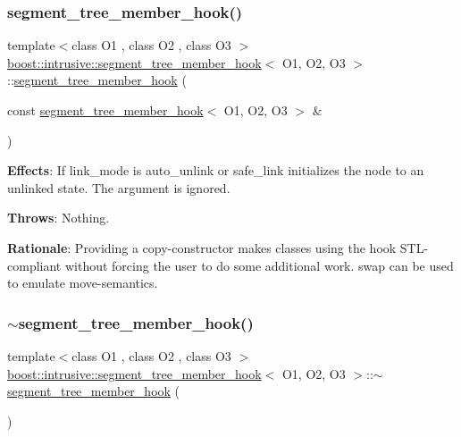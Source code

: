 \subsubsection{\texorpdfstring{segment\+\_\+tree\+\_\+member\+\_\+hook()}{segment\_tree\_member\_hook()}\hspace{0.1cm}{\footnotesize\ttfamily [2/2]}}
{\footnotesize\ttfamily template$<$class O1 , class O2 , class O3 $>$ \\
\hyperlink{classboost_1_1intrusive_1_1segment__tree__member__hook}{boost\+::intrusive\+::segment\+\_\+tree\+\_\+member\+\_\+hook}$<$ O1, O2, O3 $>$\+::\hyperlink{classboost_1_1intrusive_1_1segment__tree__member__hook}{segment\+\_\+tree\+\_\+member\+\_\+hook} (\begin{DoxyParamCaption}\item[{const \hyperlink{classboost_1_1intrusive_1_1segment__tree__member__hook}{segment\+\_\+tree\+\_\+member\+\_\+hook}$<$ O1, O2, O3 $>$ \&}]{ }\end{DoxyParamCaption})}

{\bfseries Effects}\+: If link\+\_\+mode is {\ttfamily auto\+\_\+unlink} or {\ttfamily safe\+\_\+link} initializes the node to an unlinked state. The argument is ignored.

{\bfseries Throws}\+: Nothing.

{\bfseries Rationale}\+: Providing a copy-\/constructor makes classes using the hook S\+T\+L-\/compliant without forcing the user to do some additional work. {\ttfamily swap} can be used to emulate move-\/semantics. \mbox{\label{classboost_1_1intrusive_1_1segment__tree__member__hook_aec7f97a1225f1623af0587dfb049fe79}} 
\subsubsection{\texorpdfstring{$\sim$segment\+\_\+tree\+\_\+member\+\_\+hook()}{~segment\_tree\_member\_hook()}}
{\footnotesize\ttfamily template$<$class O1 , class O2 , class O3 $>$ \\
\hyperlink{classboost_1_1intrusive_1_1segment__tree__member__hook}{boost\+::intrusive\+::segment\+\_\+tree\+\_\+member\+\_\+hook}$<$ O1, O2, O3 $>$\+::$\sim$\hyperlink{classboost_1_1intrusive_1_1segment__tree__member__hook}{segment\+\_\+tree\+\_\+member\+\_\+hook} (\begin{DoxyParamCaption}{ }\end{DoxyParamCaption})}

